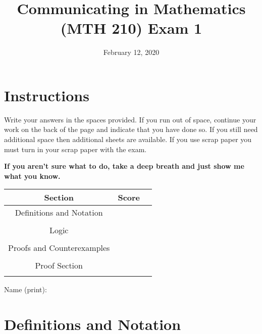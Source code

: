 \documentclass[11pt,answers]{exam}
\title{Communicating in Mathematics (MTH 210) Exam 1}
\date{February 12, 2020}
\begin{document}
\maketitle

\section*{Instructions}  



\noindent Write your answers in the spaces provided. If you run out of space, continue your work on the back of the page and indicate that you have done so. If you still need additional space then additional sheets are available. If you use scrap paper you must turn in your scrap paper with the exam. \\

\begin{center}
\textbf{If you aren't sure what to do, take a deep breath and just show me what you know.}
\end{center}
\vspace{1in}




\begin{center}


\begin{tabular}{|c|c|c|}
\hline
Section &Score\\
\hline
Definitions and Notation &\\
&\\
\hline
Logic &\\
&\\
\hline
Proofs and Counterexamples &\\
&\\
\hline
Proof Section &\\
&\\
\hline
\end{tabular}
\end{center}


\vspace{1in}

\begin{center}
Name (print): \underline{\hspace{3in}}  
\end{center}




\pagebreak


\section{Definitions and Notation}
\end{document}
